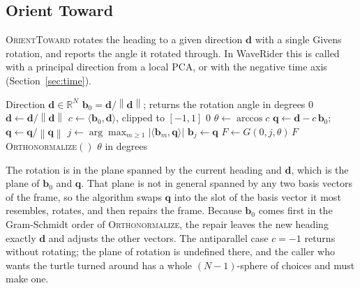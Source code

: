 \documentclass[11pt,letterpaper]{article}
\newcommand{\R}{\mathbb{R}}
\newcommand{\basis}{\mathbf{b}}
\newcommand{\norm}[1]{\left\lVert #1 \right\rVert}
\newcommand{\op}[1]{\textup{\textsc{#1}}}
\begin{document}
\subsection{Orient Toward}

\op{OrientToward} rotates the heading to a given direction
$\mathbf{d}$ with a single Givens rotation, and reports the angle it
rotated through. In WaveRider this is called with a principal direction
from a local PCA, or with the negative time axis
(Section~\ref{sec:time}).

\begin{algorithm}[H]
\caption{\op{OrientToward}$(\mathbf{d})$}
\label{alg:toward}
\begin{algorithmic}[1]
\Require Direction $\mathbf{d} \in \R^N$
\Ensure $\basis_0 = \mathbf{d} / \norm{\mathbf{d}}$; returns the rotation angle in degrees
\If{$\norm{\mathbf{d}} < 10^{-12}$} \Return $0$ \EndIf
\State $\mathbf{d} \leftarrow \mathbf{d} / \norm{\mathbf{d}}$
\State $c \leftarrow \langle \basis_0, \mathbf{d} \rangle$, clipped to $[-1, 1]$
 \Return $0$ \EndIf {}
\State $\theta \leftarrow \arccos c$
\State $\mathbf{q} \leftarrow \mathbf{d} - c\,\basis_0$;\quad $\mathbf{q} \leftarrow \mathbf{q} / \norm{\mathbf{q}}$ 
\State $j \leftarrow \arg\max_{m \geq 1} |\langle \basis_m, \mathbf{q} \rangle|$ 
\State $\basis_j \leftarrow \mathbf{q}$ 
\State $F \leftarrow G(0, j, \theta)\,F$ \Comment{now $\basis_0 = c\,\basis_0 + \sin\theta\,\mathbf{q} = \mathbf{d}$}
\State \op{Orthonormalize}$()$
\State \Return $\theta$ in degrees
\end{algorithmic}
\end{algorithm}

The rotation is in the plane spanned by the current heading and
$\mathbf{d}$, which is the plane of $\basis_0$ and $\mathbf{q}$. That
plane is not in general spanned by any two basis vectors of the frame,
so the algorithm swaps $\mathbf{q}$ into the slot of the basis vector
it most resembles, rotates, and then repairs the frame. Because
$\basis_0$ comes first in the Gram-Schmidt order of
\op{Orthonormalize}, the repair leaves the new heading exactly
$\mathbf{d}$ and adjusts the other vectors. The antiparallel case
$c = -1$ returns without rotating; the plane of rotation is undefined
there, and the caller who wants the turtle turned around has a whole
$(N-1)$-sphere of choices and must make one.
\end{document}
